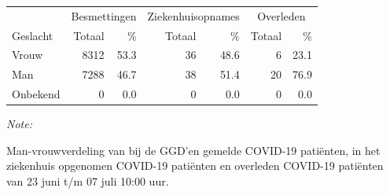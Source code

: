 \documentclass[
  english,
  man,floatsintext]{apa6}
\begin{document}
\begin{table}
\centering\begingroup\fontsize{11}{13}\selectfont

\begin{threeparttable}
\begin{tabular}{lrrrrrr}
\toprule
\multicolumn{1}{c}{ } & \multicolumn{2}{c}{Besmettingen} & \multicolumn{2}{c}{Ziekenhuisopnames} & \multicolumn{2}{c}{Overleden} \\
\cmidrule(l{3pt}r{3pt}){2-3} \cmidrule(l{3pt}r{3pt}){4-5} \cmidrule(l{3pt}r{3pt}){6-7}
Geslacht & Totaal & \% & Totaal & \% & Totaal & \%\\
\midrule
Vrouw & 8312 & 53.3 & 36 & 48.6 & 6 & 23.1\\
Man & 7288 & 46.7 & 38 & 51.4 & 20 & 76.9\\
Onbekend & 0 & 0.0 & 0 & 0.0 & 0 & 0.0\\
\bottomrule
\end{tabular}
\begin{tablenotes}
\item \textit{Note: } 
\item Man-vrouwverdeling van bij de GGD’en gemelde COVID-19 patiënten, in het ziekenhuis opgenomen COVID-19 patiënten en overleden COVID-19 patiënten van 23 juni t/m 07 juli 10:00 uur.
\end{tablenotes}
\end{threeparttable}
\endgroup{}
\end{table}
\newpage
\end{document}
